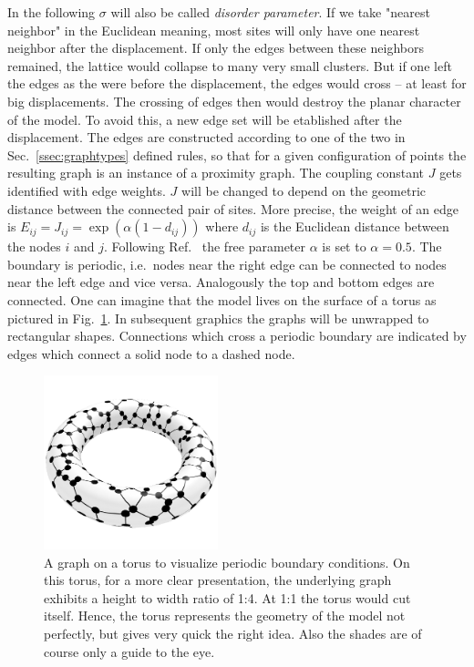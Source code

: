     In the following \(\sigma\) will also be called \emph{disorder parameter}.
    If we take "nearest neighbor" in the Euclidean meaning, most sites
    will only have one nearest neighbor after the
    displacement. If only the edges between these neighbors remained,
    the lattice would collapse to many very small clusters. But if one
    left the edges as the were before the displacement, the edges would
    cross -- at least for big displacements. The crossing of edges then
    would destroy the planar character of the model.
    To avoid this, a new edge set will be etablished after the displacement.
    The edges are constructed according to
    one of the two in Sec.\ \ref{ssec:graphtypes} defined rules,
    so that for a given configuration of points the resulting graph is an
    instance of a proximity graph. The coupling constant \(J\) gets
    identified with edge weights. \(J\) will be changed to depend on the
    geometric distance between the connected pair of sites. More precise,
    the weight of an edge is \(E_{ij} = J_{ij} = \exp (\alpha (1-d_{ij}))\)
    where \(d_{ij}\) is the Euclidean
    distance between the nodes \(i\) and \(j\). Following Ref.\ \cite{Lima2000}
    the free parameter \(\alpha\) is set to \(\alpha = 0.5\).
    The boundary is periodic, i.e.\ nodes near the right edge can be
    connected to nodes near the left edge and vice versa. Analogously the
    top and bottom edges are connected. One can imagine that the model
    lives on the surface of a torus as pictured in Fig.\ \ref{fig:torusRNG}.
    In subsequent graphics the graphs will be unwrapped to rectangular
    shapes. Connections which cross a periodic boundary are indicated
    by edges which connect a solid node to a dashed node.
    \begin{figure}[htbp]
        \centering
        \includegraphics[width=0.45\textwidth]{images/torus}
        \caption[A Graph on a Torus to Visualise Periodic Boundary Conditions]
        {
            A graph on a torus to visualize periodic boundary conditions.
            On this torus, for a more clear presentation, the underlying
            graph exhibits a height to width ratio of 1:4. At 1:1 the torus would cut
            itself. Hence, the torus represents the geometry of the model
            not perfectly, but gives very quick the right idea.
            Also the shades are of course only a guide to the eye.
        }
        \label{fig:torusRNG}
    \end{figure}\\
